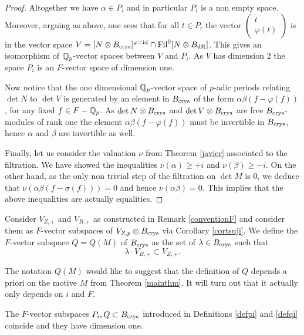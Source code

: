 \documentclass[11pt]{amsart}
\begin{document}
\begin{proof}
 Altogether we have    $\alpha \in P_i$ and in particular  $P_i$ is a non empty space. Moreover, arguing as above, one sees that for all $t \in P_i$ the vector $\begin{pmatrix} t   \\
\varphi(t)
 \end{pmatrix}$ is in the vector space $V=[N \otimes B_{\textnormal{crys}}]^{\varphi=\mathrm{id}} \cap  \textnormal{Fil}^0[N \otimes B_{\mathrm{dR}}] $. This gives an isomorphism of $\mathbb{Q}_p$-vector spaces between $V$ and $P_i$. As $V$ has dimension $2$ the space $P_i$ is an $F$-vector space of dimension one.
 
 Now notice that  the one dimensional $\mathbb{Q}_p$-vector space of $p$-adic periods relating $\det N$ to $\det V$ is generated by an element in $B_{\textnormal{crys}}$ of the form $\alpha \beta (f-\varphi( f) )$, for any fixed $f \in F- \mathbb{Q}_p$. As $\det N\otimes B_{\textnormal{crys}}$ and $\det V\otimes B_{\textnormal{crys}}$ are free $B_{\textnormal{crys}}$-modules of rank one the element $\alpha \beta (f-\varphi( f) )$ must be invertible in $B_{\textnormal{crys}}$, hence $\alpha$ and  $\beta$ are invertible as well.
 
Finally, let us consider the  valuation $\nu$ from Theorem \ref{javier} associated to the filtration. We have showed the inequalities $\nu ( \alpha) \geq +i$ and  $\nu (  \beta)\geq -i$.
On the other hand, as the only non trivial step of the filtration on $\det M$ is  $0$, we deduce that $\nu ( \alpha \beta (f-\sigma( f) ))=0$ and hence $\nu ( \alpha \beta)=0$. This implies  that the above inequalities are actually equalities.
 \end{proof}


\begin{definition}\label{defqi}
Consider $V_{Z,+}$ and $V_{B,+}$ as constructed in Remark \ref{conventionF} and consider them as $F$-vector subspaces of $V_{Z,p}\otimes B_{\textnormal{crys}}$ via Corollary \ref{cortsuji}. 
We define the $F$-vector subspace $Q=Q(M)$ of $B_{\textnormal{crys}}$ as the set of $\lambda \in B_{\textnormal{crys}}$ such that
\[\lambda \cdot V_{B,+} \subset V_{Z,+}.\]
\end{definition}
\begin{remark}
The notation $Q(M)$ would like to suggest that the definition of $Q$ depends a priori on the motive $M$ from Theorem \ref{mainthm}. It will turn out that it actually only depends on $i$ and $F$.
\end{remark}
\begin{proposition}\label{piqi}
The $F$-vector subspaces $P_i,Q\subset B_{\textnormal{crys}}$ introduced in Definitions \ref{defpi} and \ref{defqi} coincide and they have dimension one.
\end{proposition}
\end{document}
